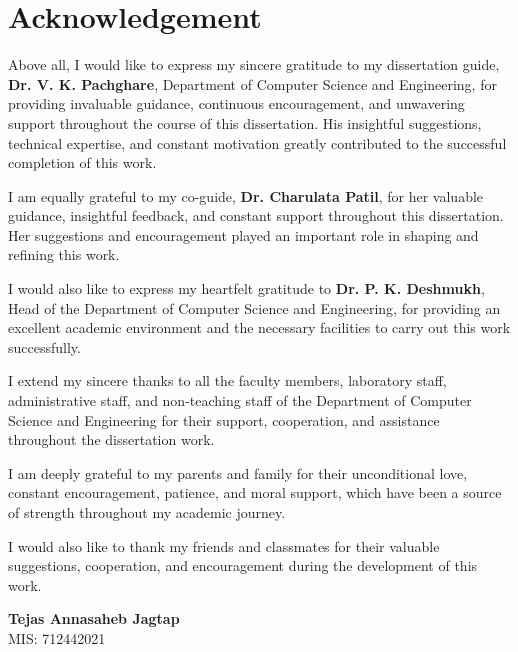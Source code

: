 \chapter*{Acknowledgement}

Above all, I would like to express my sincere gratitude to my dissertation guide,
\textbf{Dr. V. K. Pachghare}, Department of Computer Science and Engineering,
for providing invaluable guidance, continuous encouragement, and unwavering support
throughout the course of this dissertation. His insightful suggestions, technical expertise,
and constant motivation greatly contributed to the successful completion of this work.

I am equally grateful to my co-guide, \textbf{Dr. Charulata Patil}, for her valuable
guidance, insightful feedback, and constant support throughout this dissertation.
Her suggestions and encouragement played an important role in shaping and refining
this work.

I would also like to express my heartfelt gratitude to
\textbf{Dr. P. K. Deshmukh},
Head of the Department of Computer Science and Engineering,
for providing an excellent academic environment and the necessary facilities to carry out this work successfully.

I extend my sincere thanks to all the faculty members, laboratory staff, administrative
staff, and non-teaching staff of the Department of Computer Science and Engineering for their support,
cooperation, and assistance throughout the dissertation work.

I am deeply grateful to my parents and family for their unconditional love, constant
encouragement, patience, and moral support, which have been a source of strength
throughout my academic journey.

I would also like to thank my friends and classmates for their valuable suggestions,
cooperation, and encouragement during the development of this work.

\vspace{2cm}

\begin{flushright}
\textbf{Tejas Annasaheb Jagtap}\\
MIS: 712442021
\end{flushright}

